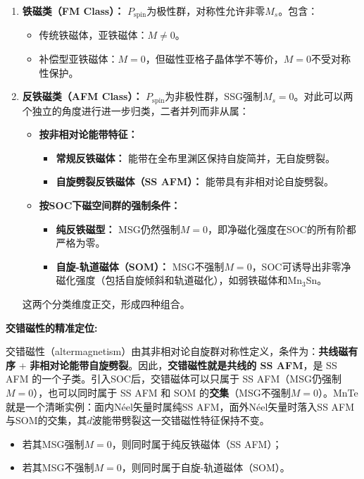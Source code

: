 \begin{enumerate}
\item \textbf{铁磁类（FM Class）：} $P_{\mathrm{spin}}$为极性群，对称性允许非零$M_s$。包含：
\begin{itemize}
\item 传统铁磁体，亚铁磁体：$M\neq0$。
\item 补偿型亚铁磁体：$M=0$，但磁性亚格子晶体学不等价，$M=0$不受对称性保护。
\end{itemize}

\item \textbf{反铁磁类（AFM Class）：} $P_{\mathrm{spin}}$为非极性群，SSG强制$M_s=0$。对此可以两个独立的角度进行进一步归类，二者并列而非从属：
\begin{itemize}
  \item \textbf{按非相对论能带特征：}
    \begin{itemize}
      \item \textbf{常规反铁磁体：} 能带在全布里渊区保持自旋简并，无自旋劈裂。
      \item \textbf{自旋劈裂反铁磁体（SS AFM）：} 能带具有非相对论自旋劈裂。
    \end{itemize}
  \item \textbf{按SOC下磁空间群的强制条件：}
    \begin{itemize}
      \item \textbf{纯反铁磁型：} MSG仍然强制$M=0$，即净磁化强度在SOC的所有阶都严格为零。
      \item \textbf{自旋-轨道磁体（SOM）：} MSG不强制$M=0$，SOC可诱导出非零净磁化强度（包括自旋倾斜和轨道磁化），如弱铁磁体和Mn$_3$Sn。
    \end{itemize}
\end{itemize}
这两个分类维度正交，形成四种组合。
\end{enumerate}

\noindent\textbf{交错磁性的精准定位:}


交错磁性（altermagnetism）由其非相对论自旋群对称性定义，条件为：\textbf{共线磁有序} + \textbf{非相对论能带自旋劈裂}。因此，\textbf{交错磁性就是共线的 SS AFM}，是 SS AFM 的一个子类。引入SOC后，交错磁体可以只属于 SS AFM（MSG仍强制$M=0$），也可以同时属于 SS AFM 和 SOM 的\textbf{交集}（MSG不强制$M=0$）。MnTe就是一个清晰实例：面内N\'{e}el矢量时属纯SS AFM，面外N\'{e}el矢量时落入SS AFM与SOM的交集，其$d$波能带劈裂这一交错磁性特征保持不变\cite{jungwirth_symmetry_2026}。
\begin{itemize}
\item 若其MSG强制$M=0$，则同时属于纯反铁磁体（SS AFM）；
\item 若其MSG不强制$M=0$，则同时属于自旋-轨道磁体（SOM）。
\end{itemize}

